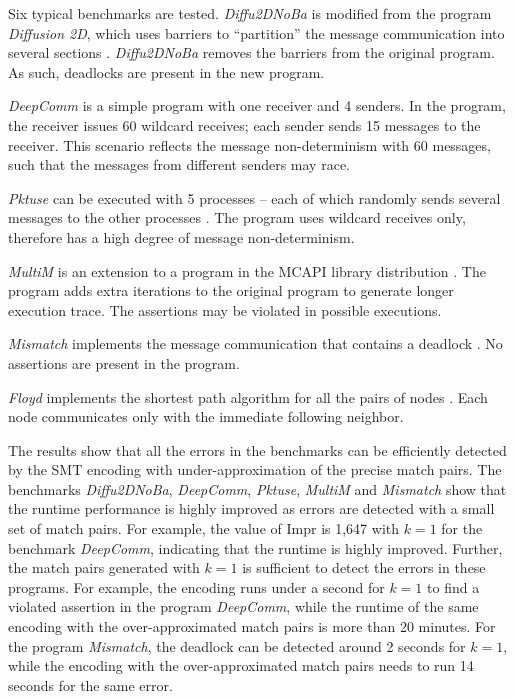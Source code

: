 Six typical benchmarks are tested. \textit{Diffu2DNoBa} is modified from the program \textit{Diffusion 2D}, which uses barriers to “partition” the message communication into several sections \cite{benchmark:fevs}. \textit{Diffu2DNoBa} removes the barriers from the original program. As such, deadlocks are present in the new program.

\textit{DeepComm} is a simple program with one receiver and 4 senders. In the program, the receiver issues 60 wildcard receives; each sender sends 15 messages to the receiver.
This scenario reflects the message non-determinism with 60 messages, such that the messages from different senders may race.

\textit{Pktuse} can be executed with 5 processes -- each of which randomly sends several messages to the other processes \cite{mpptest_benchmark}. The program uses wildcard receives only, therefore has a high degree of message non-determinism.

\textit{MultiM} is an extension to a program in the MCAPI library distribution \cite{DBLP:conf/kbse/HuangMM13}. The program adds extra iterations to the original program to generate longer execution trace. The assertions may be violated in possible executions.

\textit{Mismatch} implements the message communication that contains a deadlock \cite{HuangDeadlock}. No assertions are present in the program.

\textit{Floyd} implements the shortest path algorithm for all the pairs of nodes \cite{DBLP:conf/ppopp/XueLWGCZZV09}. Each node communicates only with the immediate following neighbor. 

The results show that all the errors in the benchmarks can be efficiently detected by the SMT encoding with under-approximation of the precise match pairs. The benchmarks \textit{Diffu2DNoBa}, \textit{DeepComm}, \textit{Pktuse}, \textit{MultiM} and \textit{Mismatch} show that the runtime performance is highly improved as errors are detected with a small set of match pairs. For example, the value of $\mathrm{Impr}$ is 1,647 with $k=1$ for the benchmark \textit{DeepComm}, indicating that the runtime is highly improved.
Further, the match pairs generated with $k=1$ is sufficient to detect the errors in these programs. 
For example, the encoding runs under a second for $k=1$ to find a violated assertion in the program \textit{DeepComm}, while the runtime of the same encoding with the over-approximated match pairs is more than 20 minutes. 
For the program \textit{Mismatch}, the deadlock can be detected around 2 seconds for $k=1$, while the encoding with the over-approximated match pairs needs to run 14 seconds for the same error. 

